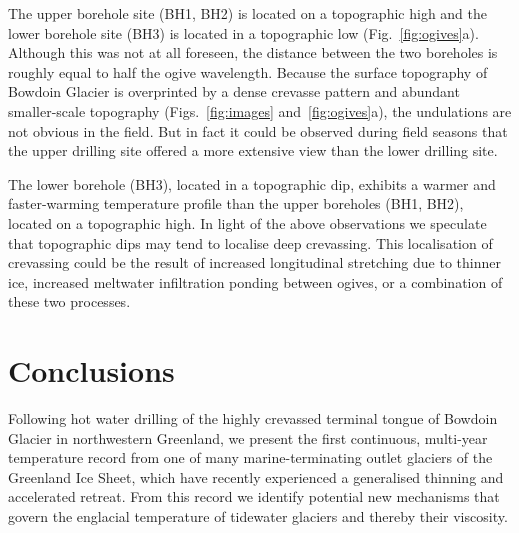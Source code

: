 \documentclass[utf8]{article}
\begin{document}
    The upper borehole site (BH1, BH2) is located on a topographic high and the
    lower borehole site (BH3) is located in a topographic low
    (Fig.~\ref{fig:ogives}a). Although this
    was not at all foreseen, the distance between the two boreholes is roughly
    equal to half the ogive wavelength. Because the surface topography of
    Bowdoin Glacier is overprinted by a dense crevasse pattern and abundant
    smaller-scale topography (Figs.~\ref{fig:images} and~\ref{fig:ogives}a),
    the undulations are not obvious in the field. But in fact it
    could be observed during field seasons that the upper drilling site offered
    a more extensive view than the lower drilling site.

    The lower borehole (BH3), located in a topographic dip, exhibits a warmer
    and faster-warming temperature profile than the upper boreholes (BH1, BH2),
    located on a topographic high. In light of the above observations we
    speculate that topographic dips may tend to localise deep
    crevassing. This localisation of crevassing could be the result of
    increased longitudinal stretching due to thinner ice, increased
    meltwater infiltration ponding between ogives, or a combination of these
    two processes.


\section{Conclusions}

    Following hot water drilling of the highly crevassed terminal tongue of
    Bowdoin Glacier in northwestern Greenland, we present the first continuous,
    multi-year temperature record from one of many marine-terminating outlet
    glaciers of the Greenland Ice Sheet, which have recently experienced a
    generalised thinning and accelerated retreat. From this record we identify
    potential new mechanisms that govern the englacial temperature of tidewater
    glaciers and thereby their viscosity.
\end{document}
